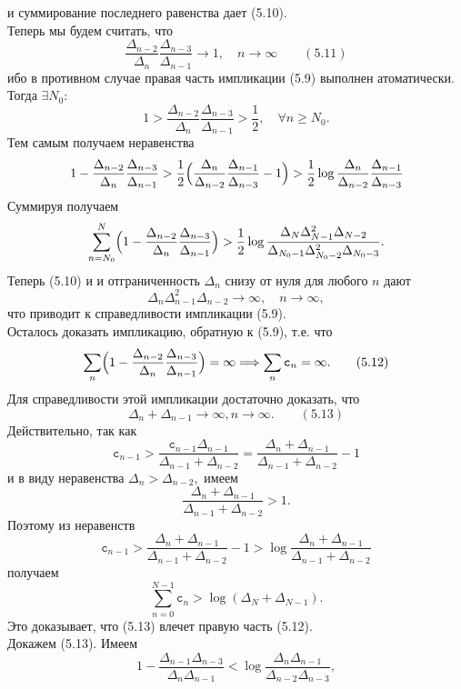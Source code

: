 \documentclass[12 pt, a4 paper]{article}
\theoremstyle{plain}   \newtheorem{Pro}{Задача}
\begin{document}
и суммирование последнего равенства дает (5.10).\\
Теперь мы будем считать, что
$$
  \frac{\Delta _{n-2}}{\Delta _n}
    \frac{\Delta _{n-3}}{\Delta _{n-1}}
	  \longrightarrow 1 , \quad
	    n \rightarrow \infty \qquad (5.11)
$$
ибо в противном случае правая часть импликации (5.9)
выполнен атоматически. Тогда
$ \exists N_0 : $			   	    			
$$
 1>\frac{\Delta _{n-2}}{\Delta _n}
   \frac{\Delta _{n-3}}{\Delta _{n-1}}>\frac{1}{2},
     \quad \forall n \geqslant N_0 .
$$
Тем самым получаем неравенства
$$
  1-\frac{\Delta _{n-2}}{\Delta _n }
    \frac{\Delta _{n-3}}{\Delta _{n-1}}
	  >\frac{1}{2} \Bigl (
	    \frac{\Delta _n}{\Delta _{n-2}}
		  \frac{\Delta _{n-1}}{\Delta _{n-3}}-1 \Bigr )
		    >\frac{1}{2} \log
			  \frac{\Delta _n}{\Delta _{n-2}}
			    \frac{\Delta _{n-1}}{\Delta _{n-3}}
$$
Суммируя получаем
$$
  \sum _{n=N_0}^N \Bigl (
    1-\frac{\Delta _{n-2}}{\Delta _n}\frac
	  {\Delta _{n-3}}{\Delta _{n-1}} \Bigr ) >
	    \frac{1}{2} \log \frac
		  {\Delta _N \Delta _{N-1}^2 \Delta _{N-2}}
		    {\Delta _{N_0 -1}\Delta _{N_0 -2}^2 \Delta _{N_0 -3}}.
$$
Теперь (5.10) и и отграниченность
$ \Delta _n $
снизу от нуля для любого
$ n $
дают
$$
  \Delta _n \Delta _{n-1}^2 \Delta _{n-2}
    \longrightarrow \infty ,
	  \quad n \rightarrow \infty ,
$$
что приводит к справедливости импликации (5.9). \\
Осталось доказать импликацию, обратную к (5.9), т.е. что
$$
  \sum _n \Bigl ( 1-
    \frac{\Delta _{n-2}}{\Delta _n}
	  \frac{\Delta _{n-3}}{\Delta _{n-1}} \Bigr )
	    =\infty \Longrightarrow \sum _n \mathtt{c}_n =\infty .
		  \qquad (5.12)
$$
Для справедливости этой импликации достаточно доказать, что
$$
  \Delta _n +\Delta _{n-1} \longrightarrow \infty ,
     n \rightarrow \infty . \qquad (5.13)
$$
Действительно, так как
$$
  \mathtt{c}_{n-1}>\frac{\mathtt{c}_{n-1}\Delta _{n-1}}
    {\Delta _{n-1}+\Delta _{n-2}}=
	  \frac{\Delta _n +\Delta _{n-1}}
	    {\Delta _{n-1} +\Delta _{n-2}}-1
$$
и в виду неравенства
$ \Delta _n >\Delta _{n-2} , $
имеем
$$
  \frac{\Delta _n +\Delta _{n-1}}
    {\Delta _{n-1}+\Delta _{n-2}}>1.
$$
Поэтому из неравенств
$$
  \mathtt{c}_{n-1}>
    \frac{\Delta _n +\Delta _{n-1}}
	  {\Delta _{n-1}+\Delta _{n-2}}-1>
	  \log \frac{\Delta _n +\Delta _{n-1}}
	    {\Delta _{n-1}+\Delta _{n-2}}
$$
получаем
$$
  \sum _{n=0}^{N-1}\mathtt{c}_n >
    \log ( \Delta _N +\Delta _{N-1} ) .
$$
Это доказывает, что (5.13) влечет правую часть (5.12).\\
Докажем (5.13). Имеем 				 			 		  	   								   	  	
$$
  1-\frac{\Delta _{n-1}\Delta _{n-3}}
    {\Delta _n \Delta _{n-1}} <
	  \log \frac{\Delta _n \Delta _{n-1}}
	    {\Delta _{n-2}\Delta _{n-3}},
$$
\end{document}
